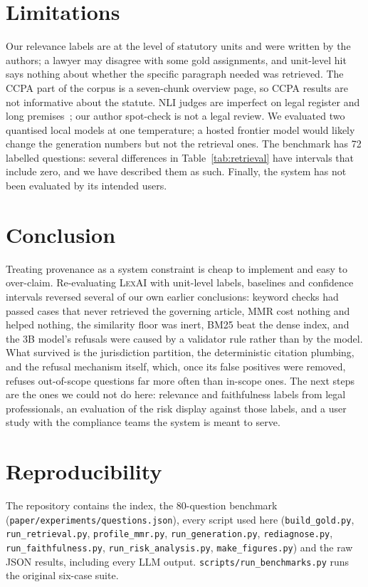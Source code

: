 \documentclass[conference]{IEEEtran}
\newcommand{\sys}{\textsc{LexAI}}
\begin{document}
\section{Limitations}
Our relevance labels are at the level of statutory units and were written by the authors; a lawyer may disagree with some gold assignments, and unit-level hit says nothing about whether the specific paragraph needed was retrieved. The CCPA part of the corpus is a seven-chunk overview page, so CCPA results are not informative about the statute. NLI judges are imperfect on legal register and long premises~\cite{laban2022summac,honovich2022true}; our author spot-check is not a legal review. We evaluated two quantised local models at one temperature; a hosted frontier model would likely change the generation numbers but not the retrieval ones. The benchmark has 72 labelled questions: several differences in Table~\ref{tab:retrieval} have intervals that include zero, and we have described them as such. Finally, the system has not been evaluated by its intended users.

\section{Conclusion}
Treating provenance as a system constraint is cheap to implement and easy to over-claim. Re-evaluating \sys{} with unit-level labels, baselines and confidence intervals reversed several of our own earlier conclusions: keyword checks had passed cases that never retrieved the governing article, MMR cost nothing and helped nothing, the similarity floor was inert, BM25 beat the dense index, and the 3B model's refusals were caused by a validator rule rather than by the model. What survived is the jurisdiction partition, the deterministic citation plumbing, and the refusal mechanism itself, which, once its false positives were removed, refuses out-of-scope questions far more often than in-scope ones. The next steps are the ones we could not do here: relevance and faithfulness labels from legal professionals, an evaluation of the risk display against those labels, and a user study with the compliance teams the system is meant to serve.

\section*{Reproducibility}
The repository contains the index, the 80-question benchmark (\texttt{paper/experiments/questions.json}), every script used here (\texttt{build\_gold.py}, \texttt{run\_retrieval.py}, \texttt{profile\_mmr.py}, \texttt{run\_generation.py}, \texttt{rediagnose.py}, \texttt{run\_faithfulness.py}, \texttt{run\_risk\_analysis.py}, \texttt{make\_figures.py}) and the raw JSON results, including every LLM output. \texttt{scripts/run\_benchmarks.py} runs the original six-case suite.
\end{document}
